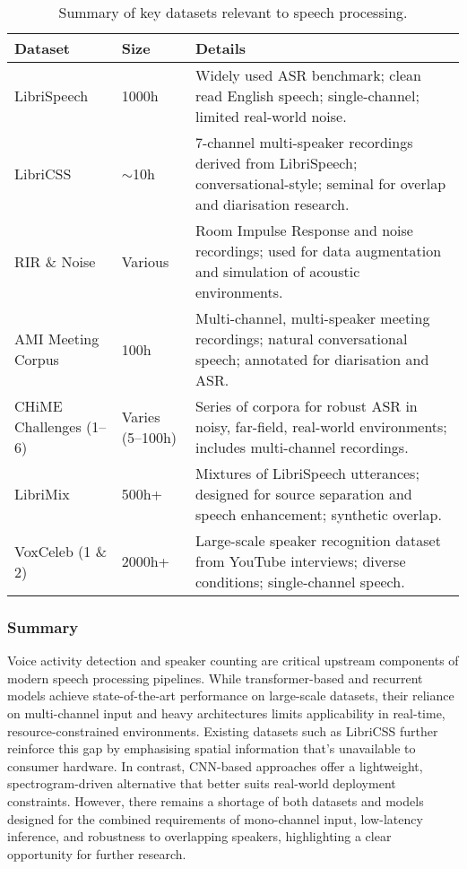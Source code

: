 \begin{table}[H]
\centering
\caption{Summary of key datasets relevant to speech processing.}
\label{tab:datasets}
\begin{tabular}{|l|l|p{8cm}|}
\hline
\textbf{Dataset} & \textbf{Size} & \textbf{Details} \\ \hline
LibriSpeech \cite{librispeech} & 1000h & Widely used ASR benchmark; clean read English speech; single-channel; limited real-world noise. \\ \hline
LibriCSS \cite{libricss} & $\sim$10h & 7-channel multi-speaker recordings derived from LibriSpeech; conversational-style; seminal for overlap and diarisation research. \\ \hline
RIR \& Noise \cite{RoomImpulseResponseDatabase} & Various & Room Impulse Response and noise recordings; used for data augmentation and simulation of acoustic environments. \\ \hline
AMI Meeting Corpus \cite{ami} & 100h & Multi-channel, multi-speaker meeting recordings; natural conversational speech; annotated for diarisation and ASR. \\ \hline
CHiME Challenges (1--6) \cite{chime} & Varies (5--100h) & Series of corpora for robust ASR in noisy, far-field, real-world environments; includes multi-channel recordings. \\ \hline
LibriMix \cite{librimix} & 500h+ & Mixtures of LibriSpeech utterances; designed for source separation and speech enhancement; synthetic overlap. \\ \hline
VoxCeleb (1 \& 2) \cite{voxceleb,voxceleb2}  & 2000h+ & Large-scale speaker recognition dataset from YouTube interviews; diverse conditions; single-channel speech. \\ \hline
\end{tabular}
\end{table}


\subsubsection{Summary}
Voice activity detection and speaker counting are critical upstream components of modern speech processing pipelines. While transformer-based and recurrent models achieve state-of-the-art performance on large-scale datasets, their reliance on multi-channel input and heavy architectures limits applicability in real-time, resource-constrained environments. Existing datasets such as LibriCSS further reinforce this gap by emphasising spatial information that's unavailable to consumer hardware. In contrast, CNN-based approaches offer a lightweight, spectrogram-driven alternative that better suits real-world deployment constraints. However, there remains a shortage of both datasets and models designed for the combined requirements of mono-channel input, low-latency inference, and robustness to overlapping speakers, highlighting a clear opportunity for further research.
